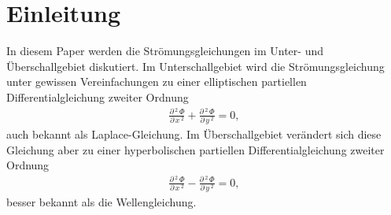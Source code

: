 %
%
%
%
\section{Einleitung\label{ueberschall:Einleitung}}
In diesem Paper werden die Strömungsgleichungen im Unter- und
Überschallgebiet diskutiert.
Im Unterschallgebiet wird die Strömungsgleichung unter gewissen
Vereinfachungen zu einer elliptischen partiellen Differentialgleichung
zweiter Ordnung
\begin{align*}
    \frac{\partial\,^2\,\Phi}{\partial\,x\,^2} +
    \frac{\partial\,^2\,\Phi}{\partial\,y\,^2} = 0, 
\end{align*}
auch bekannt als Laplace-Gleichung.
Im Überschallgebiet verändert sich diese Gleichung 
aber zu einer hyperbolischen
partiellen Differentialgleichung zweiter Ordnung
\begin{align*}
    \frac{\partial\,^2\,\Phi}{\partial\,x\,^2} -
    \frac{\partial\,^2\,\Phi}{\partial\,y\,^2} = 0, 
\end{align*}
besser bekannt als die Wellengleichung.


